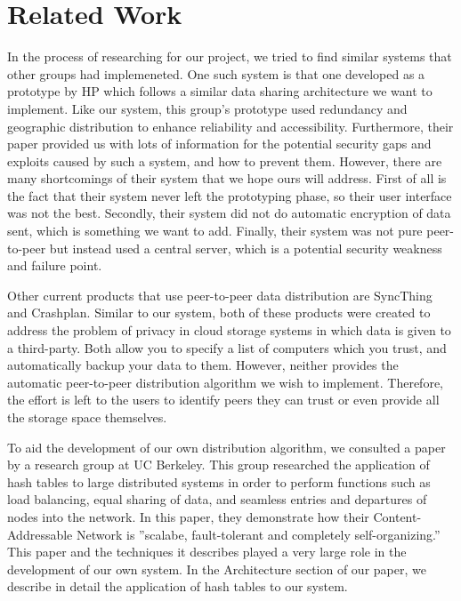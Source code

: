 \section{Related Work}
In the process of researching for our project, we tried to find similar systems that other groups had implemeneted.  One such system is that one developed as a prototype by HP which follows a similar data sharing architecture we want to implement. \cite{hp} Like our system, this group's prototype used redundancy and geographic distribution to enhance reliability and accessibility.  Furthermore, their paper provided us with lots of information for the potential security gaps and exploits caused by such a system, and how to prevent them.  However, there are many shortcomings of their system that we hope ours will address.  First of all is the fact that their system never left the prototyping phase, so their user interface was not the best.  Secondly, their system did not do automatic encryption of data sent, which is something we want to add.  Finally, their system was not pure peer-to-peer but instead used a central server, which is a potential security weakness and failure point.

Other current products that use peer-to-peer data distribution are SyncThing and Crashplan. \cite{syncthing} \cite{crashplan} Similar to our system, both of these products were created to address the problem of privacy in cloud storage systems in which data is given to a third-party.  Both allow you to specify a list of computers which you trust, and automatically backup your data to them.  However, neither provides the automatic peer-to-peer distribution algorithm we wish to implement.  Therefore, the effort is left to the users to identify peers they can trust or even provide all the storage space themselves.

To aid the development of our own distribution algorithm, we consulted a paper by a research group at UC Berkeley.  \cite{scalable}  This group researched the application of hash tables to large distributed systems in order to perform functions such as load balancing, equal sharing of data, and seamless entries and departures of nodes into the network.  In this paper, they demonstrate how their Content-Addressable Network is ''scalabe, fault-tolerant and completely self-organizing.''  This paper and the techniques it describes played a very large role in the development of our own system.  In the Architecture section of our paper, we describe in detail the application of hash tables to our system.

